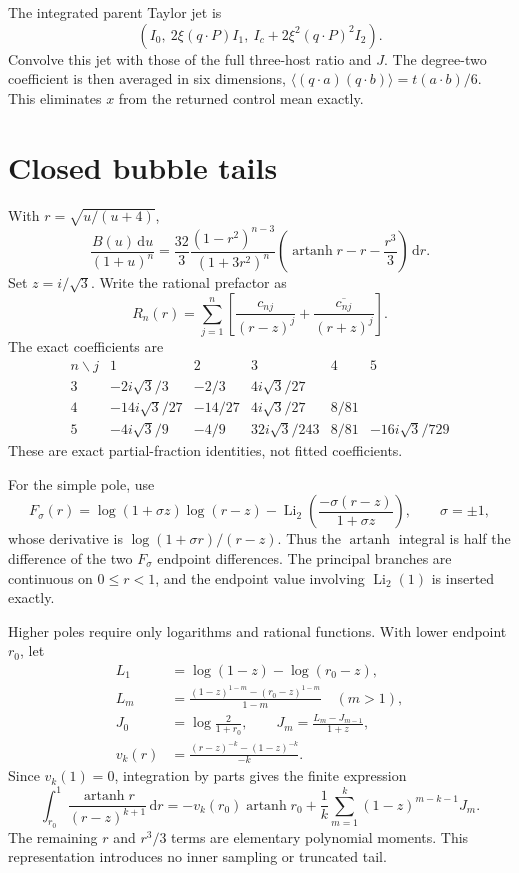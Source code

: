 \documentclass[11pt]{article}
\newcommand{\dd}{\,\mathrm d}
\begin{document}
The integrated parent Taylor jet is
\[
 \left(I_0,\ 2\xi(q\cdot P)I_1,\
 I_c+2\xi^2(q\cdot P)^2 I_2\right).
\]
Convolve this jet with those of the full three-host ratio and \(J\).
The degree-two coefficient is then averaged in six dimensions,
\(\langle(q\cdot a)(q\cdot b)\rangle=t(a\cdot b)/6\).
This eliminates \(x\) from the returned control mean exactly.

\section*{Closed bubble tails}
With \(r=\sqrt{u/(u+4)}\),
\[
 \frac{B(u)\dd u}{(1+u)^n}
 =\frac{32}{3}\frac{(1-r^2)^{n-3}}{(1+3r^2)^n}
       \left(\operatorname{artanh}r-r-\frac{r^3}{3}\right)\dd r.
\]
Set \(z=i/\sqrt3\). Write the rational prefactor as
\[
 R_n(r)=\sum_{j=1}^n\left[
 \frac{c_{nj}}{(r-z)^j}+\frac{\overline{c_{nj}}}{(r+z)^j}\right].
\]
The exact coefficients are
\[
\begin{array}{c|ccccc}
 n\backslash j&1&2&3&4&5\\ \hline
3&-2i\sqrt3/3&-2/3&4i\sqrt3/27&&\\
4&-14i\sqrt3/27&-14/27&4i\sqrt3/27&8/81&\\
5&-4i\sqrt3/9&-4/9&32i\sqrt3/243&8/81&-16i\sqrt3/729
\end{array}
\]
These are exact partial-fraction identities, not fitted coefficients.

For the simple pole, use
\[
 F_\sigma(r)=\log(1+\sigma z)\log(r-z)
       -\operatorname{Li}_2\!\left(\frac{-\sigma(r-z)}{1+\sigma z}\right),
 \qquad \sigma=\pm1,
\]
whose derivative is \(\log(1+\sigma r)/(r-z)\).
Thus the \(\operatorname{artanh}\) integral is half the difference of the
two \(F_\sigma\) endpoint differences. The principal branches are continuous
on \(0\le r<1\), and the endpoint value involving \(\operatorname{Li}_2(1)\)
is inserted exactly.

Higher poles require only logarithms and rational functions. With lower
endpoint \(r_0\), let
\begin{align*}
 L_1&=\log(1-z)-\log(r_0-z),\\
 L_m&=\frac{(1-z)^{1-m}-(r_0-z)^{1-m}}{1-m}\quad(m>1),\\
 J_0&=\log\frac{2}{1+r_0},\qquad J_m=\frac{L_m-J_{m-1}}{1+z},\\
 v_k(r)&=\frac{(r-z)^{-k}-(1-z)^{-k}}{-k}.
\end{align*}
Since \(v_k(1)=0\), integration by parts gives the finite expression
\[
 \int_{r_0}^1\frac{\operatorname{artanh}r}{(r-z)^{k+1}}\dd r
 =-v_k(r_0)\operatorname{artanh}r_0+
       \frac1k\sum_{m=1}^k(1-z)^{m-k-1}J_m.
\]
The remaining \(r\) and \(r^3/3\) terms are elementary polynomial moments.
This representation introduces no inner sampling or truncated tail.
\end{document}
